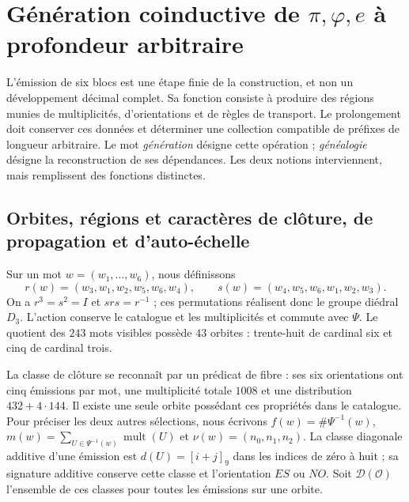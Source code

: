 \section{Génération coinductive de \texorpdfstring{\(\pi,\varphi,e\)}{pi, phi, e} à profondeur arbitraire}
\label{sec:generacion}

L'émission de six blocs est une étape finie de la construction, et non un développement décimal complet. Sa fonction consiste à produire des régions munies de multiplicités, d'orientations et de règles de transport. Le prolongement doit conserver ces données et déterminer une collection compatible de préfixes de longueur arbitraire. Le mot \emph{génération} désigne cette opération ; \emph{généalogie} désigne la reconstruction de ses dépendances. Les deux notions interviennent, mais remplissent des fonctions distinctes.

\subsection{Orbites, régions et caractères de clôture, de propagation et d'auto-échelle}

Sur un mot \(w=(w_1,\ldots,w_6)\), nous définissons
\[
 r(w)=(w_3,w_1,w_2,w_5,w_6,w_4),\qquad
 s(w)=(w_4,w_5,w_6,w_1,w_2,w_3).
\]
On a \(r^3=s^2=I\) et \(srs=r^{-1}\) ; ces permutations réalisent donc le groupe diédral \(D_3\). L'action conserve le catalogue et les multiplicités et commute avec \(\Psi\). Le quotient des \(243\) mots visibles possède \(43\) orbites : trente-huit de cardinal six et cinq de cardinal trois.

La classe de clôture se reconnaît par un prédicat de fibre : ses six orientations ont cinq émissions par mot, une multiplicité totale \(1008\) et une distribution \(432+4\cdot144\). Il existe une seule orbite possédant ces propriétés dans le catalogue. Pour préciser les deux autres sélections, nous écrivons \(f(w)=\#\Psi^{-1}(w)\), \(m(w)=\sum_{U\in\Psi^{-1}(w)}\operatorname{mult}(U)\) et \(\nu(w)=(n_0,n_1,n_2)\). La classe diagonale additive d'une émission est \(d(U)=[i+j]_9\) dans les indices de zéro à huit ; sa signature additive conserve cette classe et l'orientation \(ES\) ou \(NO\). Soit \(\mathcal D(\mathcal O)\) l'ensemble de ces classes pour toutes les émissions sur une orbite.

